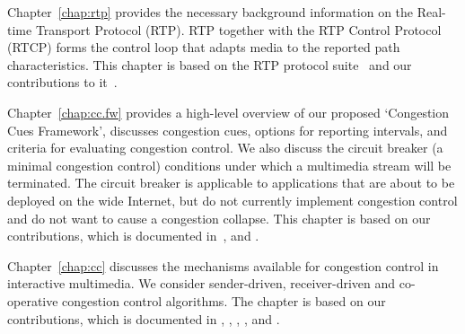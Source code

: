 
Chapter~\ref{chap:rtp} provides the necessary background information on the
Real-time Transport Protocol (RTP). RTP together with the RTP Control Protocol (RTCP)
forms the control loop that adapts media to the reported path characteristics.
This chapter is based on the RTP protocol suite~\cite{rfc3550, rfc4585,
rfc3611, rfc5104, rfc5506} and our contributions to
it~\cite{rfc7097, rfc7005, rfc7243, draft.xr.post.repair}.


Chapter~\ref{chap:cc.fw} provides a high-level overview of our proposed
`Congestion Cues Framework', discusses congestion cues, options for reporting
intervals, and criteria for evaluating congestion control. We also discuss the
circuit breaker (a minimal congestion control) conditions under which a
multimedia stream will be terminated. The circuit breaker is applicable to
applications that are about to be deployed on the wide Internet, but do not
currently implement congestion control and do not want to cause a congestion
collapse. This chapter is based on our contributions, which is documented
in~\cite{Singh:control.loops.api, draft.rmcat.app.interaction,
draft.rmcat.evaluate, Singh:PhDFw, draft.rtp.cb, Sarker:CB.lte}, and .



Chapter~\ref{chap:cc} discusses the mechanisms available for congestion
control in interactive multimedia. We consider sender-driven, receiver-driven
and co-operative congestion control algorithms. The chapter is based on our
contributions, which is documented in \cite{singh:2010.thesis}, \cite{daltat:patent},
, , and .


